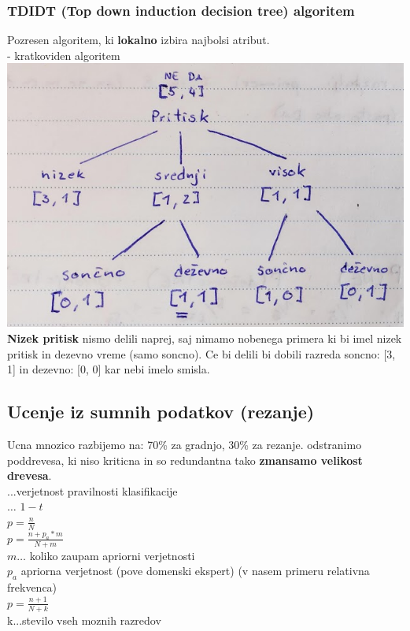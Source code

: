 \subsubsection{TDIDT (Top down induction decision tree) algoritem}
Pozresen algoritem, ki \textbf{lokalno} izbira najbolsi atribut.\\
- kratkoviden algoritem\\
\includegraphics[width=\columnwidth]{images/decision_tree2.png}\\
\textbf{Nizek pritisk} nismo delili naprej, saj nimamo nobenega primera
ki bi imel nizek pritisk in dezevno vreme (samo soncno). Ce bi delili bi
dobili razreda soncno: [3, 1] in dezevno: [0, 0] kar nebi imelo smisla.

\subsection{Ucenje iz sumnih podatkov (rezanje)}
Ucna mnozico razbijemo na: 70\% za gradnjo, 30\% za rezanje. 
 odstranimo poddrevesa, ki niso kriticna 
in so redundantna tako \textbf{zmansamo velikost drevesa}.\\

...verjetnost pravilnosti klasifikacije\\
 $\dots$ $1-t$\\
 $p=\frac{n}{N}$\\
 $p=\frac{n + p_a * m}{N+m}$\\
$m \dots$ koliko zaupam apriorni verjetnosti\\
$p_a$ apriorna verjetnost (pove domenski ekspert) (v nasem primeru relativna frekvenca)\\
 $p=\frac{n+1}{N+k}$\\
k...stevilo vseh moznih razredov

